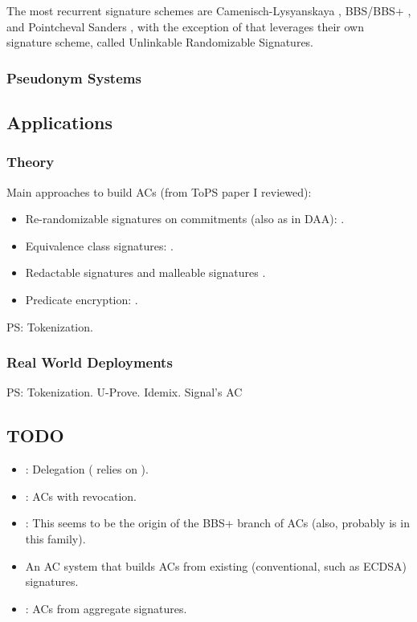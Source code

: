The most recurrent signature schemes are Camenisch-Lysyanskaya \cite{cl02,cl04},
BBS/BBS+ \cite{asm06,cdl16b}, and Pointcheval Sanders \cite{ps16}, with the
exception of \cite{cdhk15} that leverages their own signature scheme, called
Unlinkable Randomizable Signatures.

\subsubsection{Pseudonym Systems}
\label{sssec:pseudonyms}


\subsection{Applications}
\label{ssec:acapplication}

\subsubsection{Theory}
\label{sssec:actheoryapp}

Main approaches to build ACs (from ToPS paper I reviewed):

\begin{itemize}
\item Re-randomizable signatures on commitments (also as in DAA):
  \cite{cl02,cl04,lmpy16,ps16}.
\item Equivalence class signatures: \cite{fhs19,hs14}.
\item Redactable signatures \cite{cdhk15,sand20} and malleable signatures
  \cite{ckl14}.
\item Predicate encryption: \cite{dmm+18}.
\end{itemize}

PS: Tokenization.

\subsubsection{Real World Deployments}
\label{sssec:acrwdeploy}

PS: Tokenization.
U-Prove.
Idemix.
Signal's AC \needcite

\subsection{TODO}

\begin{itemize}
\item \cite{bcc+09,cklm14}: Delegation (\cite{cklm14} relies on \cite{cklm12}).
\item \cite{aks12}: ACs with revocation.
\item \cite{asm06}: This seems to be the origin of the BBS+ branch of ACs (also,
  probably \cite{aks12} is in this family).
\item \cite{cgm16} An AC system that builds ACs from existing (conventional,
  such as ECDSA) signatures.
\item \cite{cl11}: ACs from aggregate signatures.
\end{itemize}

